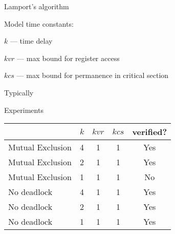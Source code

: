 \documentclass{beamer}
\def\dkb#1{{\blue #1}}
\begin{document}
\begin{slide}{Lamport's algorithm}
\small
\begin{block}{Model time constants:}
\begin{description}
\item \dkb{$k$} --- time delay
\item \dkb{$kvr$} --- max bound for register access
\item \dkb{$kcs$} --- max bound for permanence in critical section 
\end{description}
Typically
\vspace{-4mm}
\begin{center}
\end{center}
\end{block}
\vspace{-2mm}

\begin{block}{Experiments}
\begin{tabular}{|l|c|c|c|c|}
\hline
& $k$ & $kvr$ & $kcs$ & verified? \\
\hline
Mutual Exclusion & 4 & 1 & 1 & Yes\\
Mutual Exclusion & 2 & 1 & 1 & Yes\\
Mutual Exclusion & 1 & 1 & 1 & No\\
No deadlock & 4 & 1 & 1 & Yes\\
No deadlock & 2 & 1 & 1 & Yes\\
No deadlock  & 1 & 1 & 1 & Yes\\
\hline
\end{tabular}
\end{block}
\end{slide}

%
%
%
%
%
%
%
%
\end{document}
